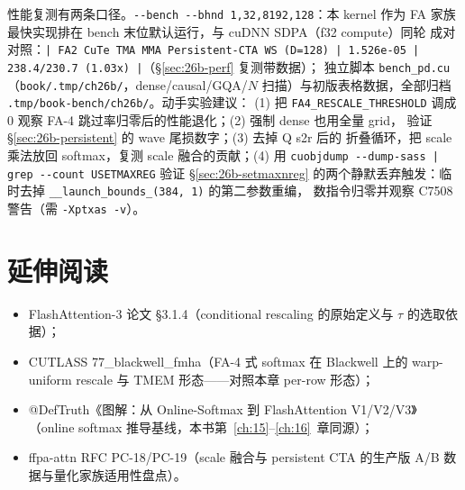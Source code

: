 性能复测有两条口径。\texttt{-{}-bench -{}-bhnd 1,32,8192,128}：本 kernel 作为
FA 家族最快实现排在 bench 末位默认运行，与 cuDNN SDPA（f32 compute）同轮
成对对照：\texttt{| FA2 CuTe TMA MMA Persistent-CTA WS (D=128) | 1.526e-05
| 238.4/230.7 (1.03x) |}（\S\ref{sec:26b-perf} 复测带数据）；
独立脚本 \texttt{bench\_pd.cu}（\texttt{book/.tmp/ch26b/}，dense/causal/GQA/$N$
扫描）与初版表格数据，全部归档 \texttt{.tmp/book-bench/ch26b/}。动手实验建议：
(1) 把 \texttt{FA4\_\allowbreak{}RESCALE\_\allowbreak{}THRESHOLD} 调成 0
观察 FA-4 跳过率归零后的性能退化；(2) 强制 dense 也用全量 grid，
验证 \S\ref{sec:26b-persistent} 的 wave 尾损数字；(3) 去掉 Q s2r 后的
折叠循环，把 scale 乘法放回 softmax，复测 scale 融合的贡献；(4) 用
\texttt{cuobjdump -{}-dump-sass | grep -{}-count USETMAXREG} 验证
\S\ref{sec:26b-setmaxnreg} 的两个静默丢弃触发：临时去掉
\texttt{\_\_launch\_\allowbreak{}bounds\_\allowbreak{}(384,~1)} 的第二参数重编，
数指令归零并观察 C7508 警告（需 \texttt{-Xptxas -v}）。

\section*{延伸阅读}

\begin{itemize}[itemsep=1pt]
  \item FlashAttention-3 论文 \S3.1.4（conditional rescaling 的原始定义与
        $\tau$ 的选取依据）；
  \item CUTLASS 77\_blackwell\_fmha（FA-4 式 softmax 在 Blackwell 上的
        warp-uniform rescale 与 TMEM 形态——对照本章 per-row 形态）；
  \item @DefTruth《图解：从 Online-Softmax 到 FlashAttention V1/V2/V3》
        （online softmax 推导基线，本书第~\ref{ch:15}--\ref{ch:16}~章同源）；
  \item ffpa-attn RFC PC-18/PC-19（scale 融合与 persistent CTA 的生产版
        A/B 数据与量化家族适用性盘点）。
\end{itemize}
